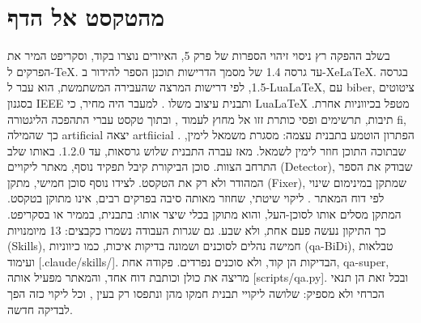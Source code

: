 \section{מהטקסט אל הדף}
בשלב ההפקה רץ ניסוי זיהוי הספרות של פרק 5, האיורים נוצרו בקוד, וסקריפט המיר את הפרקים ל-TeX. עד גרסה 1.4 של מסמך הדרישות תוכנן הספר להידור ב-XeLaTeX. בגרסה 1.5, לפי דרישות המרצה שהעבירה המשתמשת, הוא עבר ל-LuaLaTeX, עם biber, ציטוטים בסגנון IEEE ותבנית עיצוב משלו . למעבר היה מחיר, כי LuaLaTeX מטפל בכיווניות אחרת. תיבות, תרשימים ופסי כותרת זזו אל מחוץ לעמוד , ובתוך טקסט עברי התהפכה הליגטורה fi, כך שהמילה artificial יצאה artfiicial . הפתרון הוטמע בתבנית עצמה: מסגרת משמאל לימין, שבתוכה התוכן חוזר לימין לשמאל. מאז עברה התבנית שלוש גרסאות, עד 1.2.0.
באותו שלב התרחב הצוות. סוכן הביקורת קיבל תפקיד נוסף, מאתר ליקויים (Detector), שבודק את הספר המהודר ולא רק את הטקסט. לצידו נוסף סוכן חמישי, מתקן (Fixer), שמתקן במינימום שינוי לפי דוח המאתר . ליקוי שיטתי, שחוזר מאותה סיבה בפרקים רבים, אינו מתוקן בטקסט. המתקן מסלים אותו לסוכן-העל, והוא מתוקן בכלי שיצר אותו: בתבנית, בממיר או בסקריפט. כך התיקון נעשה פעם אחת, ולא שבע.
גם שגרות העבודה נשמרו כקבצים: 13 מיומנויות (Skills), חמישה נהלים לסוכנים ושמונה בדיקות איכות, כמו כיווניות (qa-BiDi), טבלאות ועימוד [.claude/skills/]. הבדיקות הן קוד, ולא סוכנים נפרדים. פקודה אחת, qa-super, מריצה את כולן וכותבת דוח אחד, והמאתר מפעיל אותה [scripts/qa.py]. ובכל זאת הן תנאי הכרחי ולא מספיק: שלושה ליקויי תבנית חמקו מהן ונתפסו רק בעין , וכל ליקוי כזה הפך לבדיקה חדשה.
